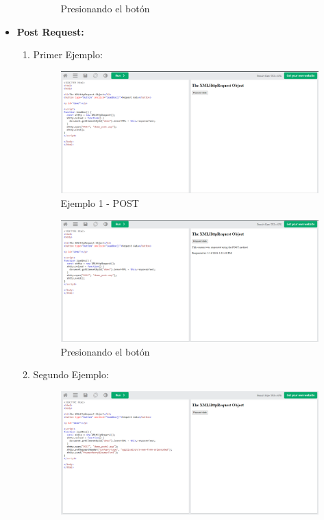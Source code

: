 \documentclass{article}
\begin{document}
\begin{itemize}
\begin{enumerate}
\begin{figure}[H]
				\caption{Presionando el botón}
			\end{figure}
		\end{enumerate}
		\item \textbf{Post Request:}
		\begin{enumerate}
			\item Primer Ejemplo:
			\begin{figure}[H]
				\centering
				\includegraphics[width=1\textwidth,keepaspectratio]{img/ejemplo7.png}
				\caption{Ejemplo 1 - POST}
			\end{figure}
			\begin{figure}[H]
				\centering
				\includegraphics[width=1\textwidth,keepaspectratio]{img/boton7.png}
				\caption{Presionando el botón}
			\end{figure}
			\item Segundo Ejemplo:
			\begin{figure}[H]
				\centering
				\includegraphics[width=1\textwidth,keepaspectratio]{img/ejemplo8.png}

\end{figure}
\end{enumerate}
\end{itemize}
\end{document}
